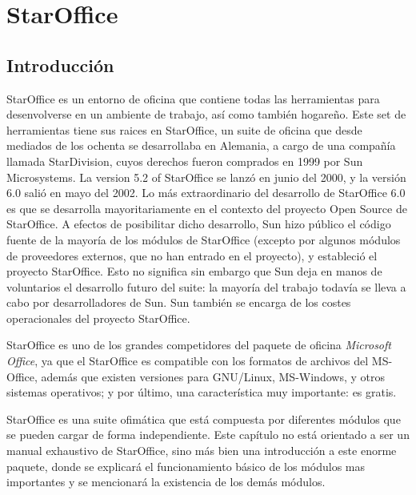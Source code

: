 
\chapter{StarOffice}
\label{staroffice.tex}

\section{Introducción}

StarOffice  es   un  entorno  de   oficina  que  contiene   todas  las
herramientas  para  desenvolverse  en  un  ambiente  de  trabajo,  así
como  también hogareño.  Este  set de  herramientas  tiene sus  raices
en  StarOffice,  un  suite  de  oficina  que  desde  mediados  de  los
ochenta se desarrollaba  en Alemania, a cargo de  una compañía llamada
StarDivision,  cuyos  derechos  fueron   comprados  en  1999  por  Sun
Microsystems. La version 5.2 of StarOffice se lanzó en junio del 2000,
y la  versión 6.0 salió  en mayo del  2002. Lo más  extraordinario del
desarrollo de StarOffice 6.0 es  que se desarrolla mayoritariamente en
el  contexto del  proyecto Open  Source  de StarOffice.  A efectos  de
posibilitar dicho desarrollo, Sun hizo  público el código fuente de la
mayoría de los  módulos de StarOffice (excepto por  algunos módulos de
proveedores externos, que no han entrado en el proyecto), y estableció
el proyecto StarOffice. Esto no significa  sin embargo que Sun deja en
manos  de  voluntarios el  desarrollo  futuro  del suite:  la  mayoría
del  trabajo todavía  se  lleva  a cabo  por  desarrolladores de  Sun.
Sun  también  se encarga  de  los  costes operacionales  del  proyecto
StarOffice.

StarOffice es uno  de los grandes competidores del  paquete de oficina
\emph{Microsoft Office},  ya que el  StarOffice es compatible  con los
formatos de archivos del MS-Office,  además que existen versiones para
GNU/Linux, MS-Windows, y otros sistemas  operativos; y por último, una
característica muy importante: es gratis.

StarOffice es  una suite ofimática  que está compuesta  por diferentes
módulos que se pueden cargar  de forma independiente. Este capítulo no
está orientado a ser un manual exhaustivo de StarOffice, sino más bien
una  introducción  a  este  enorme  paquete,  donde  se  explicará  el
funcionamiento básico de  los módulos mas importantes  y se mencionará
la existencia de los demás módulos.

